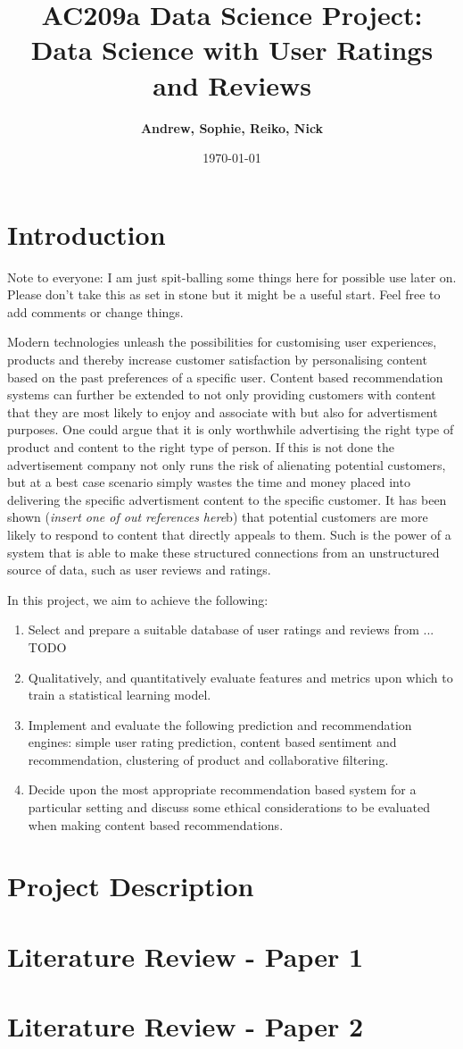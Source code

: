 \documentclass[11pt]{article}
\title{
\vspace{1in}
\textmd{\textbf{AC209a Data Science Project: Data Science with User Ratings and Reviews}}\\
\vspace{2cm}
}
\author{\textbf{Andrew, Sophie, Reiko, Nick}}
\date{\today} %
\begin{document}
\maketitle

\section*{Introduction}
	Note to everyone: I am just spit-balling some things here for possible use later on. Please don't take this as set in stone but it might be a useful start. Feel free to add comments or change things.

	Modern technologies unleash the possibilities for customising user experiences, products and thereby increase customer satisfaction by personalising content
	based on the past preferences of a specific user. Content based recommendation systems can further be extended to not only providing customers with content that they are most likely to enjoy and associate with but also for advertisment purposes. One could argue that it is only worthwhile advertising the right type of product and content to the right type of person. If this is not done the advertisement company not only runs the risk of alienating potential customers, but at a best case scenario simply wastes the time and money placed into delivering the specific advertisment content to the specific customer. It has been shown (\textit{insert one of out references here}b) that potential customers are more likely to respond to content that directly appeals to them. Such is the power of a system that is able to make these structured connections from an unstructured source of data, such as user reviews and ratings.

	In this project, we aim to achieve the following:
	\begin{enumerate}
		\item Select and prepare a suitable database of user ratings and reviews from ... TODO
		\item Qualitatively, and quantitatively evaluate features and metrics upon which to train a statistical learning model.
		\item Implement and evaluate the following prediction and recommendation engines: simple user rating prediction, content based sentiment and recommendation, clustering of product and collaborative filtering.
		\item Decide upon the most appropriate recommendation based system for a particular setting and discuss some ethical considerations to be evaluated when making content based recommendations.
	\end{enumerate}

\section*{Project Description}

\section*{Literature Review - Paper 1}

\section*{Literature Review - Paper 2}
\end{document}
